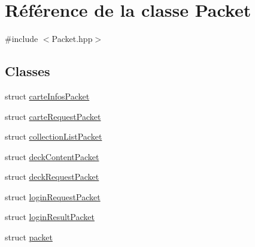 \hypertarget{classPacket}{}\section{Référence de la classe Packet}
\label{classPacket}


{\ttfamily \#include $<$Packet.\+hpp$>$}

\subsection*{Classes}
\begin{DoxyCompactItemize}
\item 
struct \hyperlink{structPacket_1_1carteInfosPacket}{carte\+Infos\+Packet}
\item 
struct \hyperlink{structPacket_1_1carteRequestPacket}{carte\+Request\+Packet}
\item 
struct \hyperlink{structPacket_1_1collectionListPacket}{collection\+List\+Packet}
\item 
struct \hyperlink{structPacket_1_1deckContentPacket}{deck\+Content\+Packet}
\item 
struct \hyperlink{structPacket_1_1deckRequestPacket}{deck\+Request\+Packet}
\item 
struct \hyperlink{structPacket_1_1loginRequestPacket}{login\+Request\+Packet}
\item 
struct \hyperlink{structPacket_1_1loginResultPacket}{login\+Result\+Packet}
\item 
struct \hyperlink{structPacket_1_1packet}{packet}
\end{DoxyCompactItemize}
